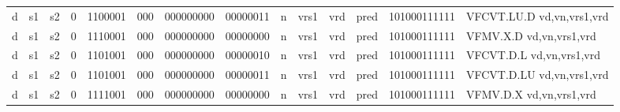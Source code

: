 \begin{landscape}
\begin{table}[p]
\begin{small}
\begin{center}
\begin{tabular}{p{0.08in}@{}p{0.08in}@{}p{0.08in}@{}p{0.08in}@{}p{0.50in}@{}p{0.30in}@{}p{0.08in}@{}p{0.8in}@{}p{0.48in}@{}p{0.32in}@{}p{0.08in}@{}p{0.8in}@{}p{0.8in}@{}p{0.4in}@{}p{0.56in}l}
\multicolumn{1}{|c|}{d} &
\multicolumn{1}{c|}{s1} &
\multicolumn{1}{c|}{s2} &
\multicolumn{1}{c|}{0} &
\multicolumn{1}{c|}{1100001} &
\multicolumn{1}{c|}{000} &
\multicolumn{2}{c|}{000000000} &
\multicolumn{2}{c|}{00000011} &
\multicolumn{1}{c|}{n} &
\multicolumn{1}{c|}{vrs1} &
\multicolumn{1}{c|}{vrd} &
\multicolumn{1}{c|}{pred} &
\multicolumn{1}{c|}{101000111111} & VFCVT.LU.D vd,vn,vrs1,vrd \\
\cline{1-15}
  

\multicolumn{1}{|c|}{d} &
\multicolumn{1}{c|}{s1} &
\multicolumn{1}{c|}{s2} &
\multicolumn{1}{c|}{0} &
\multicolumn{1}{c|}{1110001} &
\multicolumn{1}{c|}{000} &
\multicolumn{2}{c|}{000000000} &
\multicolumn{2}{c|}{00000000} &
\multicolumn{1}{c|}{n} &
\multicolumn{1}{c|}{vrs1} &
\multicolumn{1}{c|}{vrd} &
\multicolumn{1}{c|}{pred} &
\multicolumn{1}{c|}{101000111111} & VFMV.X.D vd,vn,vrs1,vrd \\
\cline{1-15}
  

\multicolumn{1}{|c|}{d} &
\multicolumn{1}{c|}{s1} &
\multicolumn{1}{c|}{s2} &
\multicolumn{1}{c|}{0} &
\multicolumn{1}{c|}{1101001} &
\multicolumn{1}{c|}{000} &
\multicolumn{2}{c|}{000000000} &
\multicolumn{2}{c|}{00000010} &
\multicolumn{1}{c|}{n} &
\multicolumn{1}{c|}{vrs1} &
\multicolumn{1}{c|}{vrd} &
\multicolumn{1}{c|}{pred} &
\multicolumn{1}{c|}{101000111111} & VFCVT.D.L vd,vn,vrs1,vrd \\
\cline{1-15}
  

\multicolumn{1}{|c|}{d} &
\multicolumn{1}{c|}{s1} &
\multicolumn{1}{c|}{s2} &
\multicolumn{1}{c|}{0} &
\multicolumn{1}{c|}{1101001} &
\multicolumn{1}{c|}{000} &
\multicolumn{2}{c|}{000000000} &
\multicolumn{2}{c|}{00000011} &
\multicolumn{1}{c|}{n} &
\multicolumn{1}{c|}{vrs1} &
\multicolumn{1}{c|}{vrd} &
\multicolumn{1}{c|}{pred} &
\multicolumn{1}{c|}{101000111111} & VFCVT.D.LU vd,vn,vrs1,vrd \\
\cline{1-15}
  

\multicolumn{1}{|c|}{d} &
\multicolumn{1}{c|}{s1} &
\multicolumn{1}{c|}{s2} &
\multicolumn{1}{c|}{0} &
\multicolumn{1}{c|}{1111001} &
\multicolumn{1}{c|}{000} &
\multicolumn{2}{c|}{000000000} &
\multicolumn{2}{c|}{00000000} &
\multicolumn{1}{c|}{n} &
\multicolumn{1}{c|}{vrs1} &
\multicolumn{1}{c|}{vrd} &
\multicolumn{1}{c|}{pred} &
\multicolumn{1}{c|}{101000111111} & VFMV.D.X vd,vn,vrs1,vrd \\
\cline{1-15}
  

\end{tabular}
\end{center}
\end{small}

\label{instr-table}
\end{table}
\end{landscape}
\restoregeometry
  

